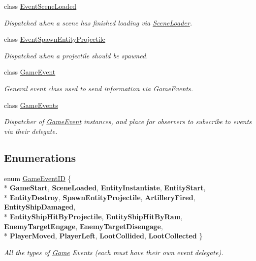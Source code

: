 \begin{DoxyCompactItemize}
class \hyperlink{class_skyrates_1_1_client_1_1_game_1_1_event_1_1_event_scene_loaded}{Event\-Scene\-Loaded}
\begin{DoxyCompactList}\small\item\em Dispatched when a scene has finished loading via \hyperlink{class_scene_loader}{Scene\-Loader}. \end{DoxyCompactList}\item 
class \hyperlink{class_skyrates_1_1_client_1_1_game_1_1_event_1_1_event_spawn_entity_projectile}{Event\-Spawn\-Entity\-Projectile}
\begin{DoxyCompactList}\small\item\em Dispatched when a projectile should be spawned. \end{DoxyCompactList}\item 
class \hyperlink{class_skyrates_1_1_client_1_1_game_1_1_event_1_1_game_event}{Game\-Event}
\begin{DoxyCompactList}\small\item\em General event class used to send information via \hyperlink{class_skyrates_1_1_client_1_1_game_1_1_event_1_1_game_events}{Game\-Events}. \end{DoxyCompactList}\item 
class \hyperlink{class_skyrates_1_1_client_1_1_game_1_1_event_1_1_game_events}{Game\-Events}
\begin{DoxyCompactList}\small\item\em Dispatcher of \hyperlink{class_skyrates_1_1_client_1_1_game_1_1_event_1_1_game_event}{Game\-Event} instances, and place for observers to subscribe to events via their delegate. \end{DoxyCompactList}\end{DoxyCompactItemize}
\subsection*{Enumerations}
\begin{DoxyCompactItemize}
\item 
enum \hyperlink{namespace_skyrates_1_1_client_1_1_game_1_1_event_a3a7e5dc62ad299d5e53abb4a3e5d5088}{Game\-Event\-I\-D} \{ \\*
{\bfseries Game\-Start}, 
{\bfseries Scene\-Loaded}, 
{\bfseries Entity\-Instantiate}, 
{\bfseries Entity\-Start}, 
\\*
{\bfseries Entity\-Destroy}, 
{\bfseries Spawn\-Entity\-Projectile}, 
{\bfseries Artillery\-Fired}, 
{\bfseries Entity\-Ship\-Damaged}, 
\\*
{\bfseries Entity\-Ship\-Hit\-By\-Projectile}, 
{\bfseries Entity\-Ship\-Hit\-By\-Ram}, 
{\bfseries Enemy\-Target\-Engage}, 
{\bfseries Enemy\-Target\-Disengage}, 
\\*
{\bfseries Player\-Moved}, 
{\bfseries Player\-Left}, 
{\bfseries Loot\-Collided}, 
{\bfseries Loot\-Collected}
 \}
\begin{DoxyCompactList}\small\item\em All the types of \hyperlink{class_game}{Game} Events (each must have their own event delegate). \end{DoxyCompactList}\end{DoxyCompactItemize}

